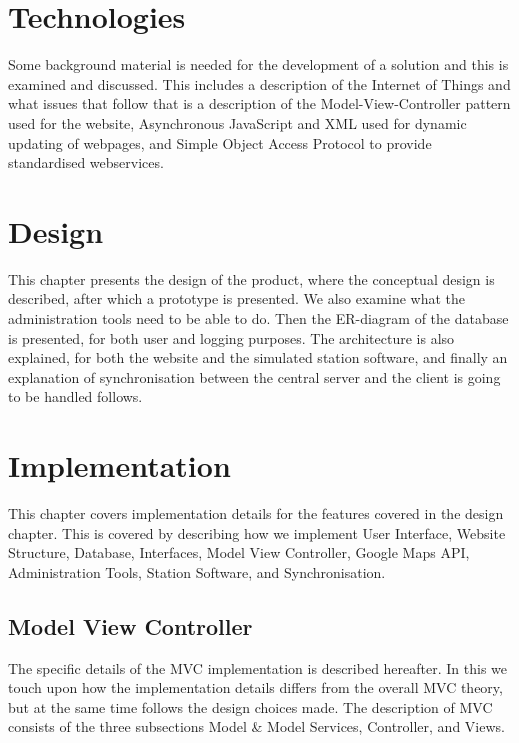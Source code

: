	\chapter{Technologies}
	Some background material is needed for the development of a solution and this is examined and discussed. This includes a description of the Internet of Things and what issues that follow that is a description of the Model-View-Controller pattern used for the website, Asynchronous JavaScript and XML used for dynamic updating of webpages, and Simple Object Access Protocol to provide standardised webservices.
	
	
	
    
		
	\chapter{Design}
	This chapter presents the design of the product, where the conceptual design is described, after which a prototype is presented.
    We also examine what the administration tools need to be able to do.
	Then the ER-diagram of the database is presented, for both user and logging purposes. 
	The architecture is also explained, for both the website and the simulated station software, and finally an explanation of synchronisation between the central server and the client is going to be handled follows.
	
	
	
	
	
	
	
	
	\chapter{Implementation}
	This chapter covers implementation details for the features covered in the design chapter.
	This is covered by describing how we implement User Interface, Website Structure, Database, Interfaces, Model View Controller, Google Maps API, Administration Tools, Station Software, and Synchronisation.
	 
	
	
	
	
	\section{Model View Controller}
	The specific details of the MVC implementation is described hereafter. In this we touch upon how the implementation details differs from the overall MVC theory, but at the same time follows the design choices made. The description of MVC consists of the three subsections Model \& Model Services, Controller, and Views.
	
	
	
	
	
	
	
	
